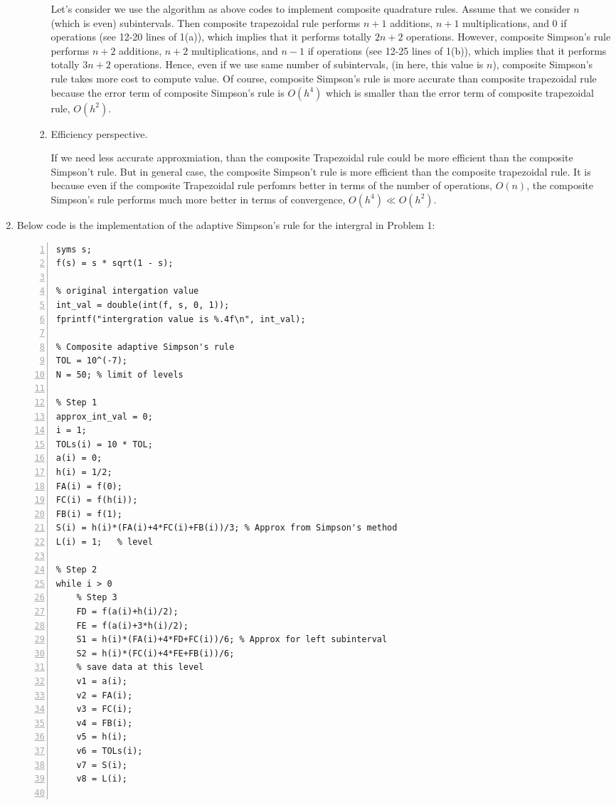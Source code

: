 \documentclass{article}
\begin{document}
\begin{enumerate}
\begin{enumerate}[wide=10pt]
\begin{enumerate}[wide=30pt]
            Let's consider we use the algorithm as above codes to implement composite quadrature rules. Assume that we consider $n$ (which is even) subintervals. Then composite trapezoidal rule performs $n+1$ additions, $n+1$ multiplications, and $0$ if operations (see 12-20 lines of 1(a)), which implies that it performs totally $2n+2$ operations. However, composite Simpson's rule performs $n+2$ additions, $n+2$ multiplications, and $n-1$ if operations (see 12-25 lines of 1(b)), which implies that it performs totally $3n+2$ operations. Hence, even if we use same number of subintervals, (in here, this value is $n$), composite Simpson's rule takes more cost to compute value. Of course, composite Simpson's rule is more accurate than composite trapezoidal rule because the error term of composite Simpson's rule is $O(h^4)$ which is smaller than the error term of composite trapezoidal rule, $O(h^2)$.
            \item Efficiency perspective.

            If we need less accurate approxmiation, than the composite Trapezoidal rule could be more efficient than the composite Simpson't rule. But in general case, the composite Simpson't rule is more efficient than the composite trapezoidal rule. It is because even if the composite Trapezoidal rule perfomrs better in terms of the number of operations, $O(n)$, the composite Simpson's rule performs much more better in terms of convergence, $O(h^4) \ll O(h^2)$.
        \end{enumerate}
    \end{enumerate}
    \item Below code is the implementation of the adaptive Simpson's rule for the intergral in Problem 1: \begin{lstlisting}[frame=single, numbers=left, style=Matlab-editor]
syms s;
f(s) = s * sqrt(1 - s);

% original intergation value
int_val = double(int(f, s, 0, 1));
fprintf("intergration value is %.4f\n", int_val);

% Composite adaptive Simpson's rule
TOL = 10^(-7);
N = 50; % limit of levels

% Step 1
approx_int_val = 0;
i = 1;
TOLs(i) = 10 * TOL;
a(i) = 0;
h(i) = 1/2;
FA(i) = f(0);
FC(i) = f(h(i));
FB(i) = f(1);
S(i) = h(i)*(FA(i)+4*FC(i)+FB(i))/3; % Approx from Simpson's method
L(i) = 1;   % level

% Step 2
while i > 0
    % Step 3
    FD = f(a(i)+h(i)/2);
    FE = f(a(i)+3*h(i)/2);
    S1 = h(i)*(FA(i)+4*FD+FC(i))/6; % Approx for left subinterval
    S2 = h(i)*(FC(i)+4*FE+FB(i))/6;
    % save data at this level
    v1 = a(i);
    v2 = FA(i);
    v3 = FC(i);
    v4 = FB(i);
    v5 = h(i);
    v6 = TOLs(i);
    v7 = S(i);
    v8 = L(i);


\end{lstlisting}
\end{enumerate}
\end{document}
